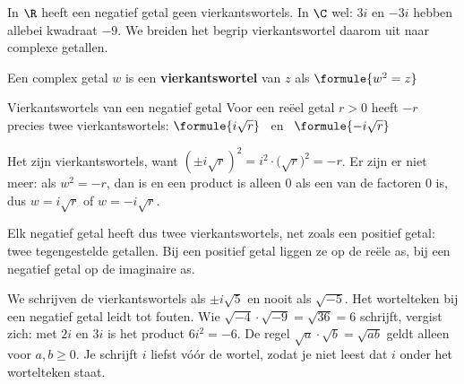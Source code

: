 In $\R$ heeft een negatief getal geen vierkantswortels. In $\C$ wel: $3i$ en $-3i$ hebben allebei kwadraat $-9$. We breiden het begrip vierkantswortel daarom uit naar complexe getallen.

\begin{theorie}
Een complex getal $w$ is een \textbf{\textcolor{accent}{vierkantswortel}} van $z$ als \quad $\formule{w^2 = z}$

\begin{stelling}{Vierkantswortels van een negatief getal}
Voor een reëel getal $r > 0$ heeft $-r$ precies twee vierkantswortels: \quad $\formule{i\sqrt{r}}$ \ en \ $\formule{-i\sqrt{r}}$
\end{stelling}

\begin{bewijs}
Het zijn vierkantswortels, want $(\pm i\sqrt{r})^2 = i^2 \cdot \bigl(\sqrt{r}\bigr)^2 = -r$. Er zijn er niet meer: als $w^2 = -r$, dan is
en een product is alleen 0 als een van de factoren 0 is, dus $w = i\sqrt{r}$ of $w = -i\sqrt{r}$.
\end{bewijs}
\end{theorie}

Elk negatief getal heeft dus twee vierkantswortels, net zoals een positief getal: twee tegengestelde getallen. Bij een positief getal liggen ze op de reële as, bij een negatief getal op de imaginaire as.

We schrijven de vierkantswortels als $\pm i\sqrt{5}$ en nooit als $\sqrt{-5}$. Het wortelteken bij een negatief getal leidt tot fouten. Wie $\sqrt{-4} \cdot \sqrt{-9} = \sqrt{36} = 6$ schrijft, vergist zich: met $2i$ en $3i$ is het product $6i^2 = -6$. De regel $\sqrt{a} \cdot \sqrt{b} = \sqrt{ab}$ geldt alleen voor $a, b \geqslant 0$. Je schrijft $i$ liefst vóór de wortel, zodat je niet leest dat $i$ onder het wortelteken staat.


\begin{oefeningen}
\end{oefeningen}

